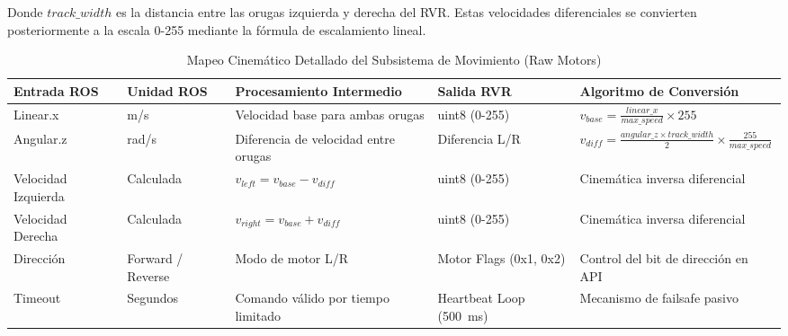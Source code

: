 \documentclass[11pt]{article}
\numberwithin{figure}{section}
\numberwithin{table}{section}
\begin{document}
Donde $track\_width$ es la distancia entre las orugas izquierda y derecha del RVR. Estas velocidades diferenciales se convierten posteriormente a la escala 0-255 mediante la fórmula de escalamiento lineal.

\begin{table}[htbp]
\centering
\caption{Mapeo Cinemático Detallado del Subsistema de Movimiento (Raw Motors)}
\label{tab:mapeo_cinematico}
\begin{tabular}{|p{}|p{}|p{}|p{}|p{}|}
\hline
\textbf{Entrada ROS} & \textbf{Unidad ROS} & \textbf{Procesamiento Intermedio} & \textbf{Salida RVR} & \textbf{Algoritmo de Conversión} \\
\hline
Linear.x & m/s & Velocidad base para ambas orugas & uint8 (0-255) & $v_{base} = \frac{linear\_x}{max\_speed} \times 255$ \\
\hline
Angular.z & rad/s & Diferencia de velocidad entre orugas & Diferencia L/R & $v_{diff} = \frac{angular\_z \times track\_width}{2} \times \frac{255}{max\_speed}$ \\
\hline
Velocidad Izquierda & Calculada & $v_{left} = v_{base} - v_{diff}$ & uint8 (0-255) & Cinemática inversa diferencial \\
\hline
Velocidad Derecha & Calculada & $v_{right} = v_{base} + v_{diff}$ & uint8 (0-255) & Cinemática inversa diferencial \\
\hline
Dirección & Forward / Reverse & Modo de motor L/R & Motor Flags (0x1, 0x2) & Control del bit de dirección en API \\
\hline
Timeout & Segundos & Comando válido por tiempo limitado & Heartbeat Loop (500~ms) & Mecanismo de failsafe pasivo \\
\hline
\end{tabular}
\end{table}
\end{document}
